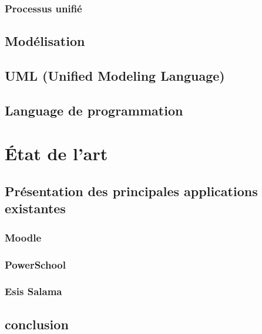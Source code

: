 \documentclass[12pt, a4paper]{report}
\begin{document}
    \subsection{Processus unifié}\label{subsec:processus-unifie}
    

    \section{Modélisation}\label{subsec:modelisation}
    

    \section{UML (Unified Modeling Language)}\label{subsec:uml}
    

    \section{Language de programmation}\label{sec:language-de-programmation}
    


    
    \chapter{État de l'art}\label{cha:etat-de-l-art}
    

    \section{Présentation des principales applications existantes}\label{sec:definitions-et-concepts-cles}
    

    \subsection{Moodle}\label{subsec:moodle}
    

    \subsection{PowerSchool}\label{subsec:powerschool}
    

    \subsection{Esis Salama}\label{subsec:esis-salamae}
    

    \section{conclusion}\label{sec:conclusion}
    
\end{document}
